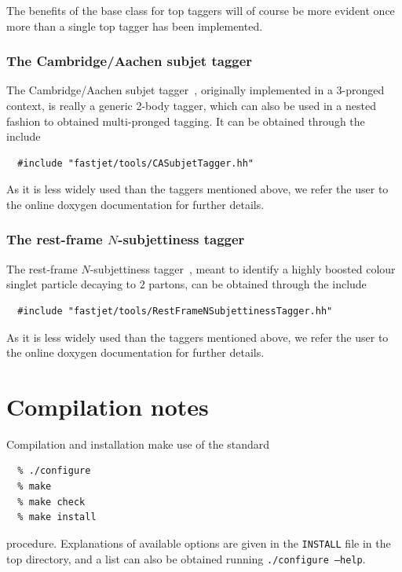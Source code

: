 \documentclass[12pt,a4]{article}
\newcommand{\ttt}[1]{{\small\texttt{#1}}}
\begin{document}
The benefits of the base class for top taggers will of course be more
evident once more than a single top tagger has been implemented.

\subsubsection{The Cambridge/Aachen subjet tagger}

The Cambridge/Aachen subjet
tagger~\cite{Butterworth:2009qa}, originally implemented in a
3-pronged context, is really a generic 2-body tagger, which can also be
used in a nested fashion to obtained multi-pronged tagging.
%
It can be obtained through the include
\begin{lstlisting}
  #include "fastjet/tools/CASubjetTagger.hh"
\end{lstlisting}
As it is less widely used than the taggers mentioned above, we refer
the user to the online doxygen documentation for further details.


\subsubsection{The rest-frame $N$-subjettiness tagger}

The rest-frame $N$-subjettiness
tagger~\cite{nsubtagger}, meant to identify a highly boosted colour
singlet particle decaying to $2$ partons, can be obtained through the include
\begin{lstlisting}
  #include "fastjet/tools/RestFrameNSubjettinessTagger.hh"
\end{lstlisting}
As it is less widely used than the taggers mentioned above, we refer
the user to the online doxygen documentation for further details.




\section{Compilation notes}

Compilation and installation make use of the standard
\begin{verbatim}
  % ./configure
  % make
  % make check
  % make install
\end{verbatim}
procedure. Explanations of available options are given in the
\ttt{INSTALL} file in the top directory, and a list can also be obtained running
\ttt{./configure --help}.
\end{document}
